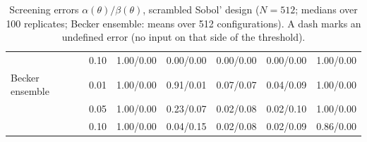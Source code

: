 \documentclass[11pt,a4paper]{article}
\begin{document}
\begin{table}[H]
\begin{tabular}{@{}llccccc@{}}
 & 0.10 & 1.00/0.00 & 0.00/0.00 & 0.00/0.00 & 0.00/0.00 & 1.00/0.00 \\
\addlinespace[2pt]
Becker ensemble & 0.01 & 1.00/0.00 & 0.91/0.01 & 0.07/0.07 & 0.04/0.09 & 1.00/0.00 \\
 & 0.05 & 1.00/0.00 & 0.23/0.07 & 0.02/0.08 & 0.02/0.10 & 1.00/0.00 \\
 & 0.10 & 1.00/0.00 & 0.04/0.15 & 0.02/0.08 & 0.02/0.09 & 0.86/0.00 \\
\bottomrule\end{tabular}
\caption{Screening errors $\alpha(\theta)/\beta(\theta)$, scrambled Sobol' design ($N=512$; medians over 100 replicates; Becker ensemble: means over 512 configurations). A dash marks an undefined error (no input on that side of the threshold).}
\label{tab:scr_sobol}
\end{table}
\end{document}
